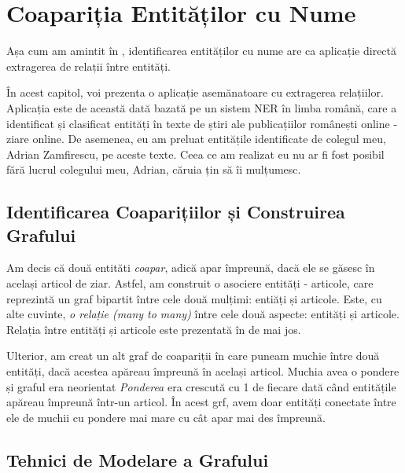 \chapter{Coapariția Entităților cu Nume}
\label{chap:entities-cooccurrence}

Așa cum am amintit în , identificarea entităților cu nume are ca aplicație directă extragerea de relații între entități.

În acest capitol, voi prezenta o aplicație asemănatoare cu extragerea relațiilor. Aplicația este de această dată bazată pe un sistem NER în limba română, care a identificat și clasificat entități în texte de știri ale publicațiilor românești online - ziare online. De asemenea, eu am preluat entitățile identificate de colegul meu, Adrian Zamfirescu, pe aceste texte. Ceea ce am realizat eu nu ar fi fost posibil fără lucrul colegului meu, Adrian, căruia țin să îi mulțumesc. 

\section{Identificarea Coaparițiilor și Construirea Grafului}

Am decis că două entităti \textit{coapar}, adică apar împreună, dacă ele se găsesc în același articol de ziar. Astfel, am construit o asociere entități - articole, care reprezintă un graf bipartit între cele două mulțimi: entiăți și articole. Este, cu alte cuvinte, \textit{o relație (many to many)} între cele două aspecte: entități și articole. Relația între entități și articole este prezentată în  de mai jos.


Ulterior, am creat un alt graf de coapariții în care puneam muchie între două entități, dacă acestea apăreau împreună în același articol. Muchia avea o pondere și graful era neorientat \textit{Ponderea} era crescută cu 1 de fiecare dată când entitățile apăreau împreună într-un articol. În acest grf, avem doar entități conectate între ele de muchii cu pondere mai mare cu cât apar mai des împreună.

\section{Tehnici de Modelare a Grafului}

